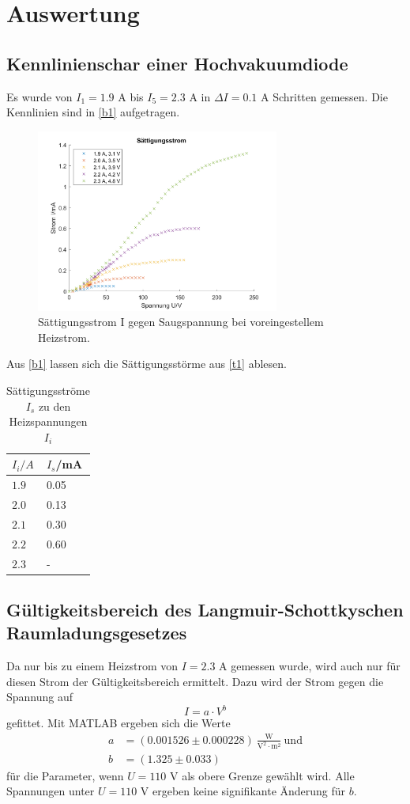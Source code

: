 \section{Auswertung}
\label{sec:Auswertung}
 \subsection{Kennlinienschar einer Hochvakuumdiode}
 Es wurde von $I_{1}=1.9$ A bis $I_{5}=2.3$ A in $\Delta I=0.1$ A Schritten gemessen. Die Kennlinien sind in \autoref{b1} aufgetragen.
 \begin{figure}[H]
 \centering
 \includegraphics[width=8cm]{s.png}
 \caption{Sättigungsstrom I gegen Saugspannung bei voreingestellem Heizstrom.}
 \label{b1}
 \end{figure}
 Aus \autoref{b1} lassen sich die Sättigungsstörme aus \autoref{t1} ablesen. 
 \begin{table}[H]
  \centering
  \caption{Sättigungsströme $I_{s}$ zu den Heizspannungen $I_{i}$}
  \begin{tabular}{l|l}
  $I_{i}/A$& $I_{s}$/mA\\\hline
  $1.9$ & 0.05\\
  $2.0$ & 0.13\\
  $2.1$ & 0.30\\
  $2.2$ & 0.60\\
  $2.3$ & -\\\hline
  \end{tabular}
  \label{t1}
 \end{table}

 \subsection{Gültigkeitsbereich des Langmuir-Schottkyschen Raumladungsgesetzes}
 Da nur bis zu einem Heizstrom von $I=2.3$ A gemessen wurde, wird auch nur für diesen Strom der Gültigkeitsbereich ermittelt. Dazu wird der Strom gegen die Spannung auf
 \begin{equation*}
   I=a\cdot V^{b}
 \end{equation*}
 gefittet. Mit MATLAB ergeben sich die Werte
 \begin{align*}
   a&=(0.001526 \pm 0.000228)\ \frac{\textrm{W}}{\textrm{V}^2 \cdot\textrm{m}^2}\ \textrm{und}\\
   b&=(1.325 \pm 0.033)
 \end{align*}
 für die Parameter, wenn $U=110$ V als obere Grenze gewählt wird. Alle Spannungen unter $U=110$ V ergeben keine signifikante Änderung für $b$.
 
